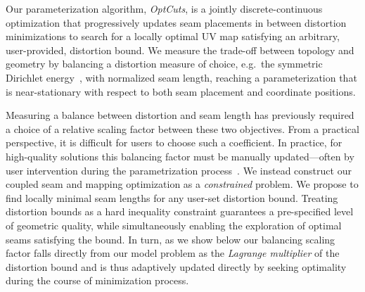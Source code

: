 Our parameterization algorithm, {\em OptCuts}, %
is a jointly discrete-continuous optimization that progressively updates seam placements in between distortion minimizations to search for a locally optimal UV map satisfying an arbitrary, user-provided, distortion bound. 
%
We measure the trade-off between topology and geometry by balancing a distortion measure of choice, e.g.\ the symmetric Dirichlet energy~\cite{Smith2015Bijective}, with normalized seam length, reaching a parameterization that is near-stationary with respect to both seam placement and coordinate positions. %

Measuring a balance between distortion and seam length has previously required a choice of a relative scaling factor between these two objectives.  From a practical perspective, it is difficult for users to choose such a coefficient. %
In practice, for high-quality solutions this balancing factor must be %
manually updated---often by user intervention during the parametrization process\ \cite{Poranne2017Autocuts}. We instead construct our coupled seam and mapping optimization as a \emph{constrained} problem. We propose to find locally minimal seam lengths for any user-set distortion bound. Treating distortion bounds as a hard inequality constraint guarantees a pre-specified level of geometric quality, while simultaneously enabling the exploration of optimal seams satisfying the bound. %
In turn, as we show below our balancing scaling factor falls directly from our model problem as the \emph{Lagrange multiplier} of the distortion bound and is thus adaptively updated directly by seeking optimality during the course of minimization process.  %

